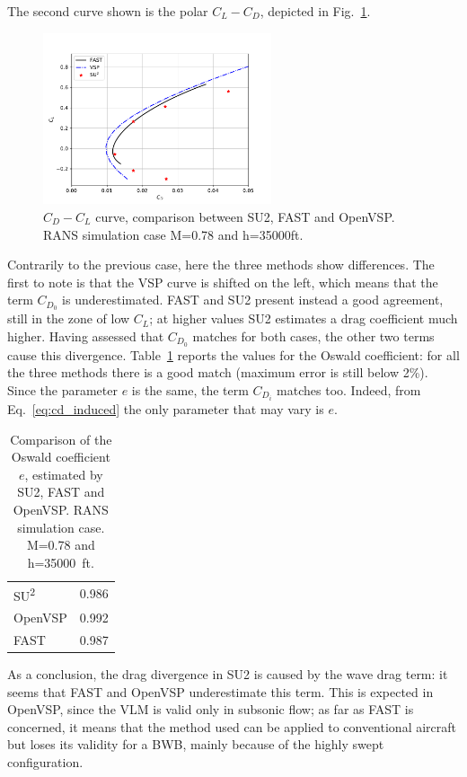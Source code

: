The second curve shown is the polar $C_L-C_D$, depicted in Fig.~\ref{fig:clcd_rans}. 
\begin{figure}[!h]
	\centering
	\includegraphics[keepaspectratio, width=0.6\textwidth]{images/chap4/clcd_rans}
	\caption{$C_D-C_L$ curve, comparison between SU2, FAST and OpenVSP. RANS simulation case M=0.78 and h=35000ft.}
	\label{fig:clcd_rans}
\end{figure}
Contrarily to the previous case, here the three methods show differences. 
The first to note is that the VSP curve is shifted on the left, which means that the term $C_{D_{0}}$ is underestimated. 
FAST and SU2 present instead a good agreement, still in the zone of low $C_L$; at higher values SU2 estimates a drag coefficient much higher. 
Having assessed that $C_{D_{0}}$ matches for both cases, the other two terms cause this divergence. 
Table~\ref{tab:oswald_comparison} reports the values for the Oswald coefficient: for all the three methods there is a good match (maximum error is still below 2\%). 
Since the parameter $e$ is the same, the term $C_{D_{i}}$ matches too. Indeed, from Eq.~\eqref{eq:cd_induced} the only parameter that may vary is $e$.
\begin{table}[!h]
	\centering
	\begin{tabular}{l c}
		\hline
		SU\textsuperscript{2} & 0.986 \\ 
		OpenVSP & 0.992 \\
		FAST & 0.987 \\
		\hline
	\end{tabular}
	\caption{Comparison of the Oswald coefficient $e$, estimated by SU2, FAST and OpenVSP. RANS simulation case. M=0.78 and h=35000~ft.}
	\label{tab:oswald_comparison}
\end{table} 
As a conclusion, the drag divergence in SU2 is caused by the wave drag term: it seems that FAST and OpenVSP underestimate this term. 
This is expected in OpenVSP, since the VLM is valid only in subsonic flow; as far as FAST is concerned, it means that the method used can be applied to conventional aircraft but loses its validity for a BWB, mainly because of the highly swept configuration. 

